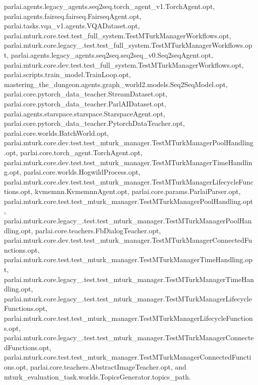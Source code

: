 parlai.\+agents.\+legacy\+\_\+agents.\+seq2seq.\+torch\+\_\+agent\+\_\+v1.\+Torch\+Agent.\+opt, parlai.\+agents.\+fairseq.\+fairseq.\+Fairseq\+Agent.\+opt, parlai.\+tasks.\+vqa\+\_\+v1.\+agents.\+V\+Q\+A\+Dataset.\+opt, parlai.\+mturk.\+core.\+test.\+test\+\_\+full\+\_\+system.\+Test\+M\+Turk\+Manager\+Workflows.\+opt, parlai.\+mturk.\+core.\+legacy\+\_.\+test.\+test\+\_\+full\+\_\+system.\+Test\+M\+Turk\+Manager\+Workflows.\+opt, parlai.\+agents.\+legacy\+\_\+agents.\+seq2seq.\+seq2seq\+\_\+v0.\+Seq2seq\+Agent.\+opt, parlai.\+mturk.\+core.\+dev.\+test.\+test\+\_\+full\+\_\+system.\+Test\+M\+Turk\+Manager\+Workflows.\+opt, parlai.\+scripts.\+train\+\_\+model.\+Train\+Loop.\+opt, mastering\+\_\+the\+\_\+dungeon.\+agents.\+graph\+\_\+world2.\+models.\+Seq2\+Seq\+Model.\+opt, parlai.\+core.\+pytorch\+\_\+data\+\_\+teacher.\+Stream\+Dataset.\+opt, parlai.\+core.\+pytorch\+\_\+data\+\_\+teacher.\+Parl\+A\+I\+Dataset.\+opt, parlai.\+agents.\+starspace.\+starspace.\+Starspace\+Agent.\+opt, parlai.\+core.\+pytorch\+\_\+data\+\_\+teacher.\+Pytorch\+Data\+Teacher.\+opt, parlai.\+core.\+worlds.\+Batch\+World.\+opt, parlai.\+mturk.\+core.\+dev.\+test.\+test\+\_\+mturk\+\_\+manager.\+Test\+M\+Turk\+Manager\+Pool\+Handling.\+opt, parlai.\+core.\+torch\+\_\+agent.\+Torch\+Agent.\+opt, parlai.\+mturk.\+core.\+dev.\+test.\+test\+\_\+mturk\+\_\+manager.\+Test\+M\+Turk\+Manager\+Time\+Handling.\+opt, parlai.\+core.\+worlds.\+Hogwild\+Process.\+opt, parlai.\+mturk.\+core.\+dev.\+test.\+test\+\_\+mturk\+\_\+manager.\+Test\+M\+Turk\+Manager\+Lifecycle\+Functions.\+opt, kvmemnn.\+Kvmemnn\+Agent.\+opt, parlai.\+core.\+params.\+Parlai\+Parser.\+opt, parlai.\+mturk.\+core.\+test.\+test\+\_\+mturk\+\_\+manager.\+Test\+M\+Turk\+Manager\+Pool\+Handling.\+opt, parlai.\+mturk.\+core.\+legacy\+\_.\+test.\+test\+\_\+mturk\+\_\+manager.\+Test\+M\+Turk\+Manager\+Pool\+Handling.\+opt, parlai.\+core.\+teachers.\+Fb\+Dialog\+Teacher.\+opt, parlai.\+mturk.\+core.\+dev.\+test.\+test\+\_\+mturk\+\_\+manager.\+Test\+M\+Turk\+Manager\+Connected\+Functions.\+opt, parlai.\+mturk.\+core.\+test.\+test\+\_\+mturk\+\_\+manager.\+Test\+M\+Turk\+Manager\+Time\+Handling.\+opt, parlai.\+mturk.\+core.\+legacy\+\_.\+test.\+test\+\_\+mturk\+\_\+manager.\+Test\+M\+Turk\+Manager\+Time\+Handling.\+opt, parlai.\+mturk.\+core.\+legacy\+\_.\+test.\+test\+\_\+mturk\+\_\+manager.\+Test\+M\+Turk\+Manager\+Lifecycle\+Functions.\+opt, parlai.\+mturk.\+core.\+test.\+test\+\_\+mturk\+\_\+manager.\+Test\+M\+Turk\+Manager\+Lifecycle\+Functions.\+opt, parlai.\+mturk.\+core.\+legacy\+\_.\+test.\+test\+\_\+mturk\+\_\+manager.\+Test\+M\+Turk\+Manager\+Connected\+Functions.\+opt, parlai.\+mturk.\+core.\+test.\+test\+\_\+mturk\+\_\+manager.\+Test\+M\+Turk\+Manager\+Connected\+Functions.\+opt, parlai.\+core.\+teachers.\+Abstract\+Image\+Teacher.\+opt, and mturk\+\_\+evaluation\+\_\+task.\+worlds.\+Topics\+Generator.\+topics\+\_\+path.



